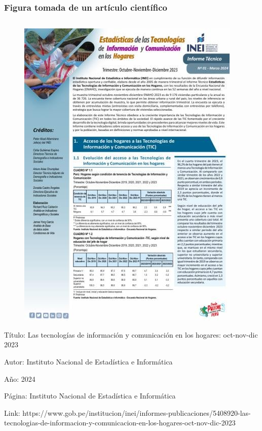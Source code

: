 \documentclass[
11pt, %
]{beamer}
\begin{document}
\begin{frame}
	\frametitle{Figura tomada de un artículo científico}

	\begin{columns}[c] %
		\begin{column}{0.5\textwidth} %
			\begin{figure}
				\centering
				\includegraphics[width=0.4\linewidth]{images/screenshot018}
			\end{figure}
			\scriptsize{

				Título: Las tecnologías de información y comunicación en los hogares:
				oct-nov-dic 2023

				Autor: Instituto Nacional de Estadística e Informática

				Año: 2024

				Página: Instituto Nacional de Estadística e Informática

				Link:
				https://www.gob.pe/institucion/inei/informes-publicaciones/5408920-las-tecnologias-de-informacion-y-comunicacion-en-los-hogares-oct-nov-dic-2023
			}


\end{column}
\end{columns}
\end{frame}
\end{document}
